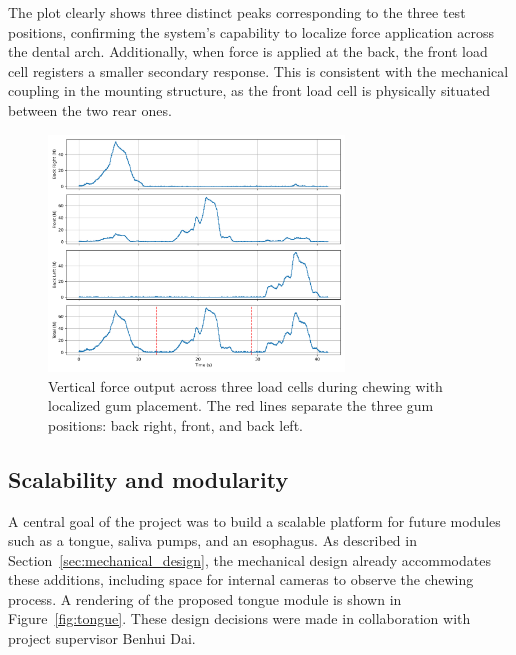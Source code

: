 The plot clearly shows three distinct peaks corresponding to the three test positions, confirming the system's capability to localize force application 
across the dental arch. Additionally, when force is applied at the back, the front load cell registers a smaller secondary response. This is consistent 
with the mechanical coupling in the mounting structure, as the front load cell is physically situated between the two rear ones.

\begin{figure}[H]
    \centering 
    \includegraphics[width=0.7\textwidth]{figures/ForceDistributionGum.png}
    \caption{Vertical force output across three load cells during chewing with localized gum placement.  
    The red lines separate the three gum positions: back right, front, and back left.}
    \label{fig:force_distribution_gum}
\end{figure}

\subsection{Scalability and modularity}
A central goal of the project was to build a scalable platform for future modules such as a tongue, saliva pumps, and an esophagus. As described in 
Section~\ref{sec:mechanical_design}, the mechanical design already accommodates these additions, including space for internal cameras to observe the 
chewing process. A rendering of the proposed tongue module is shown in Figure~\ref{fig:tongue}. These design decisions were made in collaboration with 
project supervisor Benhui Dai.

